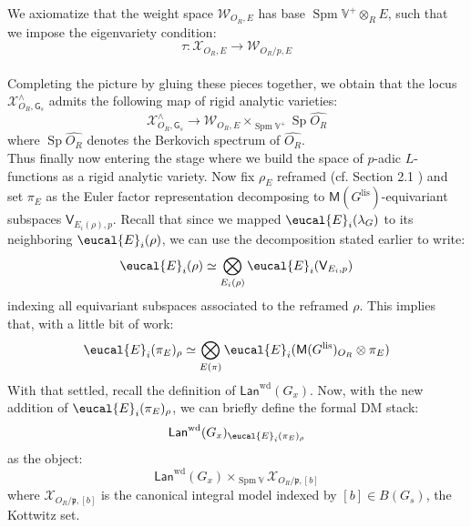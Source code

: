 \documentclass[9pt]{amsart}
\renewcommand{\[}{\begin{equation}}
\renewcommand{\]}{\end{equation}}
\newcommand{\on}{\operatorname}
\theoremstyle{plain}
\theoremstyle{remark}
\begin{document}
We axiomatize that the weight space $\mathscr{W}_{O_R, E}$ has base $\on{Spm} \mathbb{V}^+ \otimes_R E$, such that we impose the eigenvariety condition:
\[\tau: \mathscr{X}_{O_R, E} \to \mathscr{W}_{O_R/p, E}\]\\
Completing the picture by gluing these pieces together, we obtain that the locus $\mathscr{X}^{\wedge}_{O_R, \mathsf{G}_s}$ admits the following map of rigid analytic varieties:
\[\mathscr{X}^{\wedge}_{O_R, \mathsf{G}_s} \to \mathscr{W}_{O_R, E} \times_{\on{Spm} \mathbb{V}^+} \on{Sp} \widehat{O_R}\]
where $\on{Sp} \widehat{O_R}$ denotes the Berkovich spectrum of $\widehat{O_R}$.\\
Thus finally now entering the stage where we build the space of $p$-adic $L$-functions as a rigid analytic variety. Now fix $\rho_E$ reframed (cf. Section 2.1 ) and set $\pi_E$ as the Euler factor representation decomposing to $\mathsf{M}(G^{\on{lis}})$-equivariant subspaces $\mathsf{V}_{E_i(\rho), p}$. Recall that since we mapped $\eucal{E}_i(\lambda_G)$ to its neighboring $\eucal{E}_i(\rho)$, we can use the decomposition stated earlier to write:
\[\eucal{E}_i(\rho) \simeq \bigotimes_{E_i(\rho)} \eucal{E}_i(\mathsf{V}_{E_i, p})\]
indexing all equivariant subspaces associated to the reframed $\rho$.
This implies that, with a little bit of work:
\[\eucal{E}_i(\pi_E)_{\rho} \simeq \bigotimes_{E(\pi)} \eucal{E}_i(\mathsf{M}(G^{\on{lis}})_{O_R} \otimes \pi_E)\]
With that settled, recall the definition of $\mathsf{Lan}^{\on{wd}}(G_x)$. Now, with the new addition of $\eucal{E}_i(\pi_E)_{\rho}$, we can briefly define the formal DM stack:
\[\mathsf{Lan}^{\on{wd}}(G_x)_{\eucal{E}_i(\pi_E)_{\rho}}\]
as the object:
\[\mathsf{Lan}^{\on{wd}}(G_x) \times_{\on{Spm} \mathbb{V}} \mathscr{X}_{O_R/\mathfrak{p}, [b]}\]
where $\mathscr{X}_{O_R/\mathfrak{p}, [b]}$ is the canonical integral model indexed by $[b] \in B(G_s)$, the Kottwitz set. 
\end{document}
